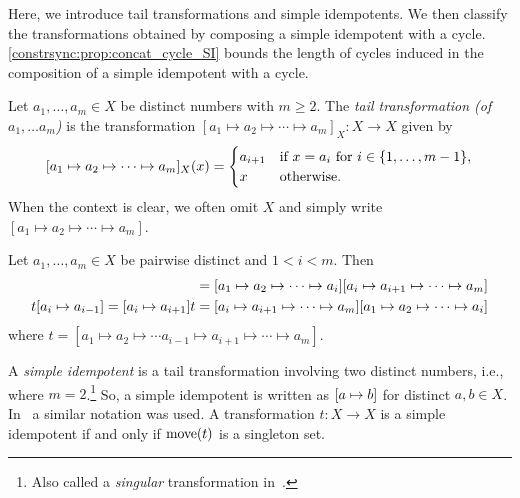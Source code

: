 
Here, we introduce tail transformations and simple idempotents.
We then classify the transformations obtained by composing a simple idempotent with a cycle.
\cref{constrsync:prop:concat_cycle_SI} bounds
the length of cycles induced in the composition of a simple idempotent with a cycle.

Let $a_1, \ldots, a_m \in X$ be distinct numbers with $m \ge 2$. The \emph{tail transformation (of $a_1,\ldots a_m$)}
is the transformation $[a_1 \mapsto a_2 \mapsto \cdots \mapsto a_m]_X \colon X \to X$
given by   \label{def:SI-mapping}
\[
\applyfunc{x}{[a_1 \mapsto a_2 \mapsto \cdots \mapsto a_m]_X} = 
\begin{cases}
	a_{i+1} & \text{if } x = a_i \text{ for } i \in \{1,\ldots,m-1\}, \\ 
	x       & \text{otherwise.}
\end{cases}
\]
When the context is clear, we often omit $X$ and simply write $[a_1 \mapsto a_2 \mapsto \cdots \mapsto a_m]$.

\begin{proposition} \label{prelim:prop:tail-comp} \label{prelim:trans:eqn:SI-one-singular}
	Let $a_1, \ldots, a_m \in X$ be pairwise distinct and $1 < i < m$. Then
	\begin{align*}
		[a_1 \mapsto a_2 \mapsto \cdots \mapsto a_m] 
		& = \concat{[a_i \mapsto a_{i+1} \mapsto \cdots \mapsto a_m]}{[a_1 \mapsto a_2 \mapsto \cdots \mapsto a_i]} \\
		t \SI{a_i}{a_{i-1}} = \SI{a_i}{a_{i+1}}t & = \concat{[a_1 \mapsto a_2 \mapsto \cdots \mapsto a_i]}{[a_i \mapsto a_{i+1} \mapsto \cdots \mapsto a_m]} 
	\end{align*}
	where $t = [a_1 \mapsto a_2 \mapsto \cdots a_{i-1} \mapsto a_{i+1} \mapsto \cdots \mapsto a_m]$.
\end{proposition}

A \emph{simple idempotent} is a tail transformation involving two distinct numbers, i.e., where $m = 2$.\footnote{Also called a \emph{singular} transformation in~\cite{DBLP:journals/ijfcs/Brzozowski13}.}
So, a simple idempotent is written as $\SI{a}{b}$ for distinct $a,b \in X$.
In~\cite{CameronRGM2017} a similar notation was used.
A transformation $t \colon X \to X$ is a simple idempotent if and only if $\move{t}$ is a singleton set.

